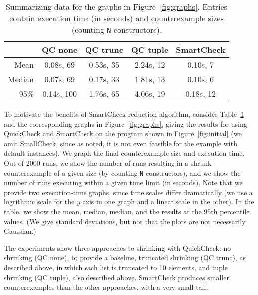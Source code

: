 \documentclass{sigplanconf}
\newcommand{\ttp}[1]{\texttt{#1}}
\begin{document}
\begin{table}[ht]
\footnotesize
  \begin{center}
    \begin{tabular}{|r||c|c|c|c|}
\hline
           & QC none    & QC trunc   & QC tuple   & SmartCheck\\
\hline \hline
Mean       & 0.08s, 69  & 0.53s, 35  & 2.24s, 12  & 0.10s, 7\\
\hline
Median     & 0.07s, 69  & 0.17s, 33  & 1.81s, 13  & 0.10s, 6\\
\hline
95\%       & 0.14s, 100 & 1.76s, 65  & 4.06s, 19  & 0.18s, 12\\
\hline
    \end{tabular}
  \end{center}
  \caption{Summarizing data for the graphs in Figure~\ref{fig:graphs}. Entries
    contain execution time (in seconds) and counterexample sizes (counting
    \ttp{N} constructors).}
  \label{table:results}
\end{table}

To motivate the benefits of SmartCheck reduction algorithm, consider
Table~\ref{table:results} and the corresponding graphs in
Figure~\ref{fig:graphs}, giving the results for using QuickCheck and SmartCheck
on the program shown in Figure~\ref{fig:initial} (we omit SmallCheck, since as
noted, it is not even feasible for the example with default instances).  We
graph the final counterexample size and execution time.  Out of 2000 runs, we
show the number of runs resulting in a shrunk counterexample of a given size (by
counting \ttp{N} constructors), and we show the number of runs executing within
a given time limit (in seconds).  Note that we provide two execution-time
graphs, since time scales differ dramatically (we use a logrithmic scale for the
$y$ axis in one graph and a linear scale in the other).  In the table, we show
the mean, median, median, and the results at the 95th percentile values.  (We
give standard deviations, but not that the plots are not necessarily Gaussian.)

The experiments show three approaches to shrinking with QuickCheck: no shrinking
(QC none), to provide a baseline, truncated shrinking (QC trunc), as described
above, in which each list is truncated to 10 elements, and tuple shrinking (QC
tuple), also described above.  SmartCheck produces smaller counterexamples than
the other approaches, with a very small tail.
\end{document}
